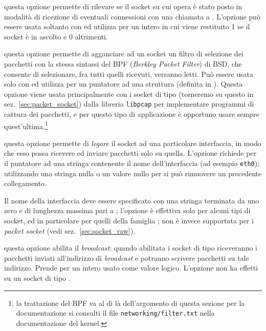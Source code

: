 \begin{basedescript}{\desclabelwidth{2.2cm}\desclabelstyle{\nextlinelabel}}
\item[\constd{SO\_ACCEPTCONN}] questa opzione permette di rilevare se il socket
  su cui opera è stato posto in modalità di ricezione di eventuali connessioni
  con una chiamata a . L'opzione può essere usata soltanto con
   ed utilizza per  un intero in cui viene
  restituito 1 se il socket è in ascolto e 0 altrimenti.

\item[\constd{SO\_ATTACH\_FILTER}] questa opzione permette di agganciare ad un
  socket un filtro di selezione dei pacchetti con la stessa sintassi del BPF
  (\textit{Berkley Packet Filter}) di BSD, che consente di selezionare, fra
  tutti quelli ricevuti, verranno letti. Può essere usata solo con
   ed utilizza per  un puntatore ad una
  struttura  (definita in
  ). Questa opzione viene usata principalmente con i
  socket di tipo  (torneremo su questo in
  sez.~\ref{sec:packet_socket}) dalla libreria \texttt{libpcap} per
  implementare programmi di cattura dei pacchetti, e per questo tipo di
  applicazione è opportuno usare sempre quest'ultima.\footnote{la trattazione
    del BPF va al di là dell'argomento di questa sezione per la documentazione
    si consulti il file \texttt{networking/filter.txt} nella documentazione
    del kernel.}

\item[\constd{SO\_BINDTODEVICE}] questa opzione permette di \textsl{legare} il
  socket ad una particolare interfaccia, in modo che esso possa ricevere ed
  inviare pacchetti solo su quella. L'opzione richiede per  il
  puntatore ad una stringa contenente il nome dell'interfaccia (ad esempio
  \texttt{eth0}); utilizzando una stringa nulla o un valore nullo per
   si può rimuovere un precedente collegamento.

  Il nome della interfaccia deve essere specificato con una stringa terminata
  da uno zero e di lunghezza massima pari a ; l'opzione è
  effettiva solo per alcuni tipi di socket, ed in particolare per quelli della
  famiglia ; non è invece supportata per i \textit{packet
    socket} (vedi sez.~\ref{sec:socket_raw}). 

\item[\constd{SO\_BROADCAST}] questa opzione abilita il \textit{broadcast}:
  quando abilitata i socket di tipo  riceveranno i
  pacchetti inviati all'indirizzo di \textit{broadcast} e potranno scrivere
  pacchetti su tale indirizzo.  Prende per  un intero usato come
  valore logico. L'opzione non ha effetti su un socket di tipo
  .


\end{basedescript}
